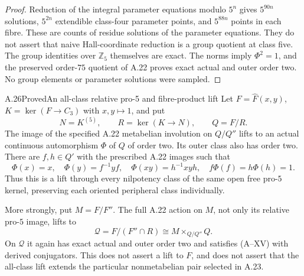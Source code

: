 \begin{proof}
Reduction of the integral parameter equations modulo
$5^n$ gives $5^{90n}$ solutions, $5^{2n}$ extendible
class-four parameter points, and $5^{88n}$ points in
each fibre. These are counts of residue solutions of
the parameter equations. They do not assert that naive
Hall-coordinate reduction is a group quotient at class
five. The group identities over $\mathbb Z_5$ themselves
are exact. The norms imply $\Phi^2=1$, and the preserved
order-$75$ quotient of A.22 proves exact actual and
outer order two. No group elements or parameter
solutions were sampled.
\end{proof}

\begin{statement}{A.26}{Proved}{An all-class relative pro-5 and fibre-product lift}
Let $F=\widehat F(x,y)$,
$K=\ker(F\to C_3)$ with $x,y\mapsto1$, and put
\[
 N=K^{(5)},\qquad R=\ker(K\to N),\qquad Q=F/R.
\]
The image of the specified A.22 metabelian involution
on $Q/Q''$ lifts to an actual continuous automorphism
$\Phi$ of $Q$ of order two. Its outer class also has
order two. There are $f,h\in Q'$ with the prescribed
A.22 images such that
\[
 \Phi(x)=x,\quad\Phi(y)=f^{-1}yf,\quad
 \Phi(xy)=h^{-1}xyh,\quad f\Phi(f)=h\Phi(h)=1.
                                                               \tag{A--XV}
\]
Thus this is a lift through every nilpotency class of
the same open free pro-$5$ kernel, preserving each
oriented peripheral class individually.

More strongly, put $M=F/F''$. The full A.22 action
on $M$, not only its relative pro-$5$ image, lifts to
\[
 \mathcal Q=F/(F''\cap R)
       \cong M\mathbin{\times}_{Q/Q''}Q.                         \tag{A--XVI}
\]
On $\mathcal Q$ it again has exact actual and outer
order two and satisfies (A--XV) with derived
conjugators. This does not assert a lift to $F$, and
does not assert that the all-class lift extends the
particular nonmetabelian pair selected in A.23.
\end{statement}
